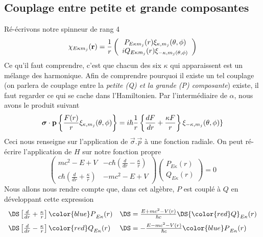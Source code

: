 \subsection{Couplage entre petite et grande composantes}
Ré-écrivons notre spinneur de rang 4
\begin{equation}
\chi_{E \kappa m_j} ({\bf r}) =\frac{1}{r} \left( \begin{array}{c}
 P_{E \kappa m_j}(r) \xi_{\kappa,m_j}(\theta, \phi) \\ 
 iQ_{E \kappa m_j} (r)  \xi_{- \kappa, m_j (\theta, \phi)} 
\end{array} \right)
\end{equation}
Ce qu'il faut comprendre, c'est que chacun des six $\kappa$ qui apparaissent est un mélange des 
harmonique. Afin de comprendre pourquoi il existe un tel couplage (on parlera de couplage entre 
la \textit{petite (Q) et la grande (P) composante}) existe, il faut regarder ce qui se cache dans
l'Hamiltonien. Par l'intermédiaire de $\alpha$, nous avons le produit suivant
\begin{equation}
\mbox{\boldmath $ \sigma $} \cdot {\bf p}
\left\{ \frac{F(r)}{r} \xi_{\kappa, m_j} (\theta, \phi) \right\}
= i \hbar \frac{1}{r} \left\{ \frac{dF}{dr} + \frac{\kappa F}{r} \right\}  \xi_{-\kappa, m_j} (\theta, \phi)\}
\end{equation}
Ceci nous renseigne sur l'application de $\vec{\sigma}.\vec{p}$ à une fonction radiale. On peut 
ré-écrire l'application de $H$ sur notre fonction propre
\begin{equation}
\left(
\begin{array}{cc}
mc^2 -E + V  &  -c \hbar \left( \frac{d}{dr} - \frac{\kappa}{r} \right) \\
 c \hbar \left( \frac{d}{dr} + \frac{\kappa}{r} \right) & -mc^2 -E + V 
\end{array} 
\right)
\left(
\begin{array}{c}
P_{E \kappa} (r) \\ Q_{E \kappa} (r) \end{array}
 \right) = 0
\end{equation}
Nous allons nous rendre compte que, dans cet algèbre, $P$ est couplé à $Q$ en développant cette
expression
\begin{equation}
\begin{array}{ll}
\DS\left[  \frac{d}{dr} + \frac{\kappa}{r}   \right] 
{\color{blue} P}_{E \kappa} (r)
&\DS= \frac{E + mc^2 - V(r)}{\hbar c} 
\DS{\color{red} Q}_{E \kappa} (r)\vspace{2mm}\\
\DS\left[  \frac{d}{dr} - \frac{\kappa}{r}   \right] 
{\color{red} Q}_{E \kappa} (r)
&\DS= - \frac{E - mc^2 - V(r)}{\hbar c} 
{\color{blue} P}_{E \kappa} (r)
\end{array}
\end{equation}

